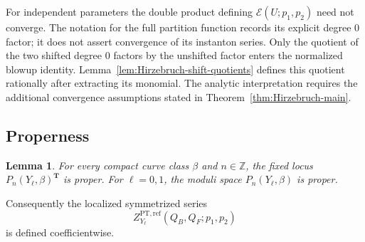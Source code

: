 \documentclass{amsart}
\newtheorem{lemma}{Lemma}
\theoremstyle{definition}
\numberwithin{equation}{section}
\newcommand{\Z}{\mathbb Z}
\newcommand{\PT}{\mathrm{PT}}
\begin{document}
For independent parameters the double product defining \(\mathcal E(U;p_1,p_2)\) need not converge.  The notation for the full partition function records its explicit degree \(0\) factor; it does not assert convergence of its instanton series.  Only the quotient of the two shifted degree \(0\) factors by the unshifted factor enters the normalized blowup identity.  Lemma~\ref{lem:Hirzebruch-shift-quotients} defines this quotient rationally after extracting its monomial.  The analytic interpretation requires the additional convergence assumptions stated in Theorem~\ref{thm:Hirzebruch-main}.

\subsection{Properness}
\begin{lemma}
\label{lem:Hirzebruch-fixed-proper}
For every compact curve class \(\beta\) and \(n\in\Z\), the fixed locus \(P_n(Y_\ell,\beta)^{\mathbf T}\) is proper.  For \(\ell=0,1\), the moduli space \(P_n(Y_\ell,\beta)\) is proper.
\end{lemma}

Consequently the localized symmetrized series
\begin{equation}
 Z_{Y_\ell}^{\PT,\mathrm{ref}}
 (Q_B,Q_F;p_1,p_2)
\label{eq:Hirzebruch-PT-series}
\end{equation}
is defined coefficientwise.
\end{document}
